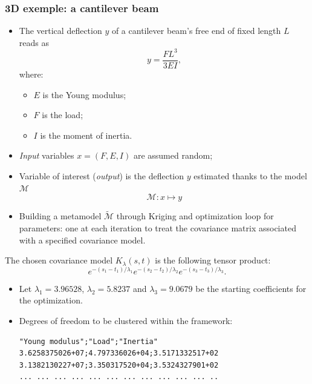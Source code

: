 \begin{frame}
\frametitle{3D exemple: a cantilever beam}

\begin{itemize}
\item The vertical deflection $y$ of a cantilever beam's free end of fixed length $L$ reads as
\[ y=\frac{FL^3}{3EI}, \]
where:
\begin{itemize}
\item $E$ is the Young modulus; 
\item $F$ is the load;
\item $I$ is the moment of inertia.
\end{itemize}

\item \textit{Input} variables $x=(F,E,I)$ are assumed random;

\item Variable of interest (\textit{output}) is the deflection $y$ estimated thanks to the model $\mathcal{M}$
\[ \mathcal{M}: x \mapsto y\]

\item Building a metamodel $\tilde{\mathcal{M}}$ through Kriging and optimization loop for parameters: one \hmat at each iteration to treat the covariance matrix associated with a specified covariance model.
\end{itemize}

\end{frame}

\begin{frame}[fragile]

 The chosen covariance model $K_{\lambda}(s,t)$ is the following tensor product:
\[ e^{-(s_1-t_1)/\lambda_1} e^{-(s_2-t_2)/\lambda_2} e^{-(s_3-t_3)/\lambda_3}. \]
\begin{itemize}
\item Let $\lambda_1 = 3.96528$, $\lambda_2 = 5.8237$ and $\lambda_3 = 9.0679$ be the starting coefficients for the optimization.

\item Degrees of freedom to be clustered within the \hmat framework:
\begin{lstlisting}
"Young modulus";"Load";"Inertia" 
3.6258375026+07;4.797336026+04;3.5171332517+02
3.1382130227+07;3.350317520+04;3.5324327901+02
... ... ... ... ... ... ... ... ... ... ... ..
\end{lstlisting}
\end{itemize}
\end{frame}

